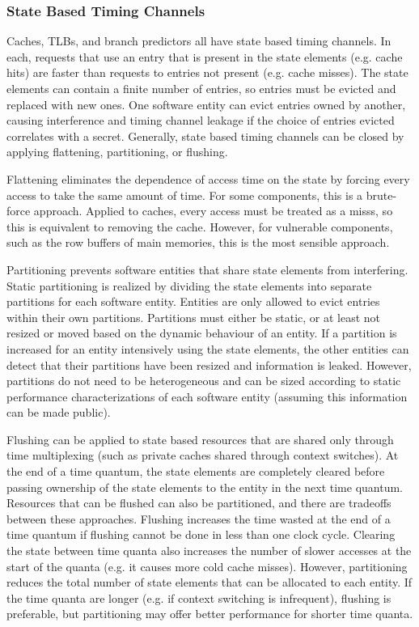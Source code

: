 \subsubsection{State Based Timing Channels}
Caches, TLBs, and branch predictors all have state based timing channels. In 
each, requests that use an entry that is present in the state elements (e.g. 
cache hits) are faster than requests to entries not present (e.g. cache 
misses). The state elements can contain a finite number of entries, so entries 
must be evicted and replaced with new ones. One software entity can evict 
entries owned by another, causing interference and timing channel leakage if 
the choice of entries evicted correlates with a secret. Generally, state based 
timing channels can be closed by applying flattening, partitioning, or 
flushing.

Flattening eliminates the dependence of access time on the state by forcing 
every access to take the same amount of time. For some components, this is a 
brute-force approach. Applied to caches, every access must be treated as a 
misss, so this is equivalent to removing the cache. However, for vulnerable 
components, such as the row buffers of main memories, this is the most 
sensible approach.

Partitioning prevents software entities that share state elements from 
interfering. Static partitioning is realized by dividing the state elements 
into separate partitions for each software entity. Entities are only allowed to 
evict entries within their own partitions. Partitions must either be static, or 
at least not resized or moved based on the dynamic behaviour of an entity. If a 
partition is increased for an entity intensively using the state elements, the 
other entities can detect that their partitions have been resized and 
information is leaked. However, partitions do not need to be heterogeneous and 
can be sized according to static performance characterizations of each software 
entity (assuming this information can be made public).

Flushing can be applied to state based resources that are shared only through 
time multiplexing (such as private caches shared through context switches). 
At the end of a time quantum, the state elements are completely cleared before 
passing ownership of the state elements to the entity in the next time quantum. 
Resources that can be flushed can also be partitioned, and there are tradeoffs 
between these approaches. Flushing increases the time wasted at the end of a 
time quantum if flushing cannot be done in less than one clock cycle. Clearing 
the state between time quanta also increases the number of slower accesses at 
the start of the quanta (e.g. it causes more cold cache misses). However, 
partitioning reduces the total number of state elements that can be allocated 
to each entity. If the time quanta are longer (e.g. if context switching is 
infrequent), flushing is preferable, but partitioning may offer better 
performance for shorter time quanta.

